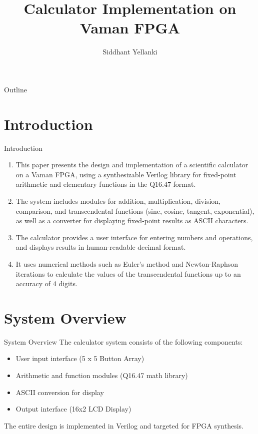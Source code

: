 \documentclass{beamer}
\title{Calculator Implementation on Vaman FPGA}
\author{Siddhant Yellanki}
\theoremstyle{remark}
\begin{document}
\begin{frame}
    \titlepage 
\end{frame}

\logo{}

\begin{frame}{Outline}
    \tableofcontents
\end{frame}

\section{Introduction}
\begin{frame}{Introduction}
    \begin{enumerate}
        \item This paper presents the design and implementation of a scientific calculator on a Vaman FPGA, using a synthesizable Verilog library for fixed-point arithmetic and elementary functions in the Q16.47 format.
        \item The system includes modules for addition, multiplication, division, comparison, and transcendental functions (sine, cosine, tangent, exponential), as well as a converter for displaying fixed-point results as ASCII characters.
        \item The calculator provides a user interface for entering numbers and operations, and displays results in human-readable decimal format.
        \item It uses numerical methods such as Euler's method and Newton-Raphson iterations to calculate the values of the transcendental functions up to an accuracy of 4 digits.
    \end{enumerate}
\end{frame}

\section{System Overview}
\begin{frame}{System Overview}
    The calculator system consists of the following components:
    \begin{itemize}
        \item User input interface (5 x 5 Button Array)
        \item Arithmetic and function modules (Q16.47 math library)
        \item ASCII conversion for display
        \item Output interface (16x2 LCD Display)
    \end{itemize}
    The entire design is implemented in Verilog and targeted for FPGA synthesis.
\end{frame}
\end{document}
